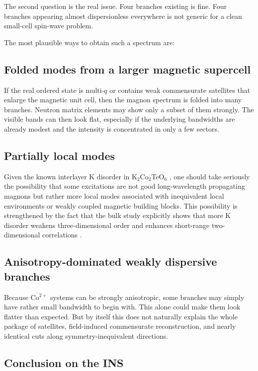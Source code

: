\documentclass[11pt]{article}
\begin{document}
The second question is the real issue. Four branches existing is fine. Four branches appearing almost dispersionless everywhere is not generic for a clean small-cell spin-wave problem.

The most plausible ways to obtain such a spectrum are:

\subsection{Folded modes from a larger magnetic supercell}

If the real ordered state is multi-$q$ or contains weak commensurate satellites that enlarge the magnetic unit cell, then the magnon spectrum is folded into many branches. Neutron matrix elements may show only a subset of them strongly. The visible bands can then look flat, especially if the underlying bandwidths are already modest and the intensity is concentrated in only a few sectors.

\subsection{Partially local modes}

Given the known interlayer K disorder in K$_2$Co$_2$TeO$_6$ \cite{Xu2023K2Co2TeO6}, one should take seriously the possibility that some excitations are not good long-wavelength propagating magnons but rather more local modes associated with inequivalent local environments or weakly coupled magnetic building blocks. This possibility is strengthened by the fact that the bulk study explicitly shows that more K disorder weakens three-dimensional order and enhances short-range two-dimensional correlations \cite{Xu2023K2Co2TeO6}.

\subsection{Anisotropy-dominated weakly dispersive branches}

Because Co$^{2+}$ systems can be strongly anisotropic, some branches may simply have rather small bandwidth to begin with. This alone could make them look flatter than expected. But by itself this does not naturally explain the whole package of satellites, field-induced commensurate reconstruction, and nearly identical cuts along symmetry-inequivalent directions.

\subsection{Conclusion on the INS}
\end{document}
